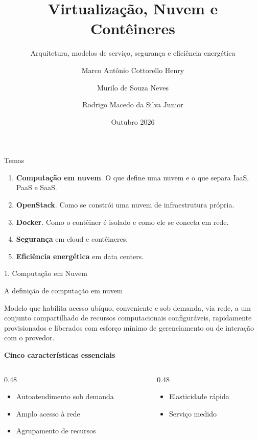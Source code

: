 \documentclass[aspectratio=169]{beamer}
\title[Virtualização, Nuvem e Contêineres]{Virtualização, Nuvem e Contêineres}
\subtitle[]{Arquitetura, modelos de serviço, segurança e eficiência energética}
\author[Marco, Murilo e Rodrigo]{Marco Antônio Cottorello Henry \and Murilo de Souza Neves \and Rodrigo Macedo da Silva Junior}
\date{Outubro 2026}
\newcommand{\divisor}[1]{%
\begin{frame}
  \begin{center}
    \begin{tcolorbox}[
        width=0.97\textwidth,
        colback=structure.fg!90!black,
        colframe=structure.fg!80!black,
        coltext=white,
        boxrule=0pt,
        arc=3mm,
        drop shadow,
        halign=center,
        top=4mm,
        bottom=4mm
      ]
      {\Large #1\par}
    \end{tcolorbox}
  \end{center}
\end{frame}}
\begin{document}
\begin{frame}
    \titlepage
\end{frame}

\begin{frame}{Temas}
  \begin{enumerate}
    \setcounter{enumi}{0}
    \item \textbf{Computação em nuvem}. O que define uma nuvem e o que separa IaaS, PaaS e SaaS.
    \item \textbf{OpenStack}. Como se constrói uma nuvem de infraestrutura própria.
    \setcounter{enumi}{3}
    \item \textbf{Docker}. Como o contêiner é isolado e como ele se conecta em rede.
    \setcounter{enumi}{5}
    \item \textbf{Segurança} em cloud e contêineres.
    \item \textbf{Eficiência energética} em data centers.
  \end{enumerate}
  \vspace{0.3cm}
\end{frame}

\divisor{1. Computação em Nuvem}

\begin{frame}{A definição de computação em nuvem}
  \begin{tcolorbox}[colback=structure.fg!10, colframe=structure.fg!60, arc=2mm]
    Modelo que habilita acesso ubíquo, conveniente e sob demanda, via rede, a um conjunto compartilhado de recursos computacionais configuráveis, rapidamente provisionados e liberados com esforço mínimo de gerenciamento ou de interação com o provedor.
  \end{tcolorbox}
  \vspace{0.3cm}
  \textbf{Cinco características essenciais}
  \begin{columns}[T]
    \begin{column}{0.48\textwidth}
      \begin{itemize}
        \item Autoatendimento sob demanda
        \item Amplo acesso à rede
        \item Agrupamento de recursos
      \end{itemize}
    \end{column}
    \begin{column}{0.48\textwidth}
      \begin{itemize}
        \item Elasticidade rápida
        \item Serviço medido
      \end{itemize}
    \end{column}
  \end{columns}
  \vspace{0.2cm}
\end{frame}
\end{document}
